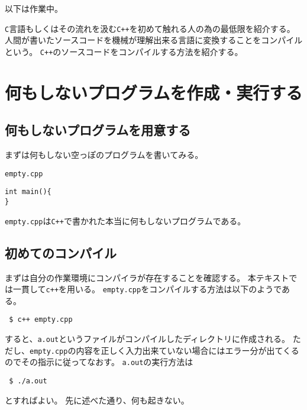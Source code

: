 以下は作業中。


\texttt{C}言語もしくはその流れを汲む\texttt{C++}を初めて触れる人の為の最低限を紹介する。
 人間が書いたソースコードを機械が理解出来る言語に変換することをコンパイルという。
 \texttt{C++}のソースコードをコンパイルする方法を紹介する。



\section{何もしないプログラムを作成・実行する}


 \subsection{何もしないプログラムを用意する}
 まずは何もしない空っぽのプログラムを書いてみる。
 \begin{itembox}{\texttt{empty.cpp}}
\begin{verbatim}
int main(){
}
\end{verbatim}
 \end{itembox}
\texttt{empty.cpp}は\texttt{C++}で書かれた本当に何もしないプログラムである。


 \subsection{初めてのコンパイル}
 まずは自分の作業環境にコンパイラが存在することを確認する。
 本テキストでは一貫して\verb|c++|を用いる。
 \texttt{empty.cpp}をコンパイルする方法は以下のようである。
\begin{verbatim}
 $ c++ empty.cpp
\end{verbatim}
すると、\texttt{a.out}というファイルがコンパイルしたディレクトリに作成される。
ただし、\texttt{empty.cpp}の内容を正しく入力出来ていない場合にはエラー分が出てくるのでその指示に従ってなおす。
\texttt{a.out}の実行方法は
\begin{verbatim}
 $ ./a.out
\end{verbatim}
とすればよい。
先に述べた通り、何も起きない。



